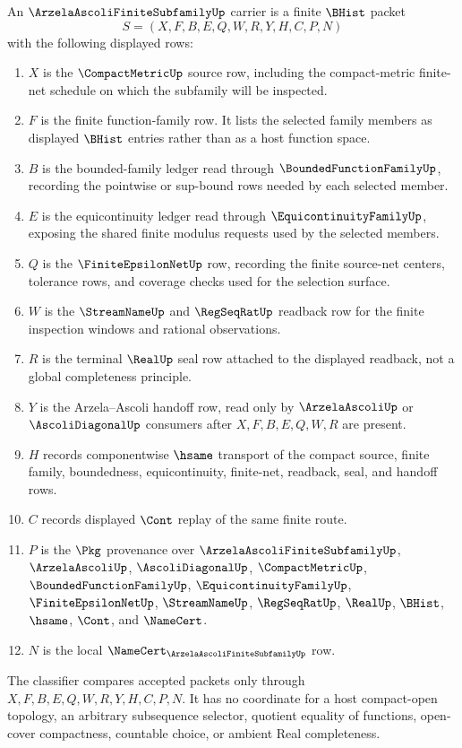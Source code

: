 \begin{definition}
\label{def:arzela-ascoli-finite-subfamily-carrier}
An $\ArzelaAscoliFiniteSubfamilyUp$ carrier is a finite $\BHist$ packet
$$
S=(X,F,B,E,Q,W,R,Y,H,C,P,N)
$$
with the following displayed rows:
\begin{enumerate}
\item $X$ is the $\CompactMetricUp$ source row, including the compact-metric finite-net schedule on which the subfamily will be inspected.
\item $F$ is the finite function-family row. It lists the selected family members as displayed $\BHist$ entries rather than as a host function space.
\item $B$ is the bounded-family ledger read through $\BoundedFunctionFamilyUp$, recording the pointwise or sup-bound rows needed by each selected member.
\item $E$ is the equicontinuity ledger read through $\EquicontinuityFamilyUp$, exposing the shared finite modulus requests used by the selected members.
\item $Q$ is the $\FiniteEpsilonNetUp$ row, recording the finite source-net centers, tolerance rows, and coverage checks used for the selection surface.
\item $W$ is the $\StreamNameUp$ and $\RegSeqRatUp$ readback row for the finite inspection windows and rational observations.
\item $R$ is the terminal $\RealUp$ seal row attached to the displayed readback, not a global completeness principle.
\item $Y$ is the Arzela--Ascoli handoff row, read only by $\ArzelaAscoliUp$ or $\AscoliDiagonalUp$ consumers after $X,F,B,E,Q,W,R$ are present.
\item $H$ records componentwise $\hsame$ transport of the compact source, finite family, boundedness, equicontinuity, finite-net, readback, seal, and handoff rows.
\item $C$ records displayed $\Cont$ replay of the same finite route.
\item $P$ is the $\Pkg$ provenance over $\ArzelaAscoliFiniteSubfamilyUp$, $\ArzelaAscoliUp$, $\AscoliDiagonalUp$, $\CompactMetricUp$, $\BoundedFunctionFamilyUp$, $\EquicontinuityFamilyUp$, $\FiniteEpsilonNetUp$, $\StreamNameUp$, $\RegSeqRatUp$, $\RealUp$, $\BHist$, $\hsame$, $\Cont$, and $\NameCert$.
\item $N$ is the local $\NameCert_{\ArzelaAscoliFiniteSubfamilyUp}$ row.
\end{enumerate}
The classifier compares accepted packets only through $X,F,B,E,Q,W,R,Y,H,C,P,N$. It has no coordinate for a host compact-open topology, an arbitrary subsequence selector, quotient equality of functions, open-cover compactness, countable choice, or ambient Real completeness.
\end{definition}


